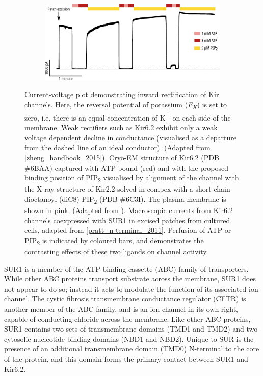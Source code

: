 \begin{figure}[h]
\begin{subfigure}[t]{0.9\textwidth}
		\centering
		\includegraphics[width=\textwidth]{shyng_atp_pip_trace.pdf}
	\end{subfigure}
	\caption[Structure of Kir6.2]{
		 Current-voltage plot demonstrating inward rectification of Kir channels.
		Here, the reversal potential of potassium (\textit{E\textsubscript{K}}) is set to zero, i.e. there is an equal concentration of K\textsuperscript{+} on each side of the membrane.
		Weak rectifiers such as Kir6.2 exhibit only a weak voltage dependent decline in conductance (visualised as a departure from the dashed line of an ideal conductor).
		(Adapted from \ref{zheng_handbook_2015}).
		 Cryo-EM structure of Kir6.2 (PDB \#6BAA) captured with ATP bound (red) and with the proposed binding position of PIP\textsubscript{2} visualised by alignment of the channel with the X-ray structure of Kir2.2 solved in compex with a short-chain dioctanoyl (diC8) PIP\textsubscript{2} (PDB \#6C3I).
		The plasma membrane is shown in pink.
		(Adapted from \cite{puljung_cryo-electron_2018}).
		 Macroscopic currents from Kir6.2 channels coexpressed with SUR1 in excised patches from cultured cells, adapted from \ref{pratt_n-terminal_2011}.
		Perfusion of ATP or PIP\textsubscript{2} is indicated by coloured bars, and demonstrates the contrasting effects of these two ligands on channel activity.
	}
	\label{ch1fig:kir_breakdown}
\end{figure}

SUR1 is a member of the ATP-binding cassette (ABC) family of transporters.
While other ABC proteins transport substrate across the membrane, SUR1 does not appear to do so; instead it acts to modulate the function of its associated ion channel.
The cystic fibrosis transmembrane conductance regulator (CFTR) is another member of the ABC family, and is an ion channel in its own right, capable of conducting chloride across the membrane.
Like other ABC proteins, SUR1 contains two sets of transmembrane domains (TMD1 and TMD2) and two cytosolic nucleotide binding domains (NBD1 and NBD2).
Unique to SUR is the presence of an additional transmembrane domain (TMD0) N-terminal to the core of the protein, and this domain forms the primary contact between SUR1 and Kir6.2.


